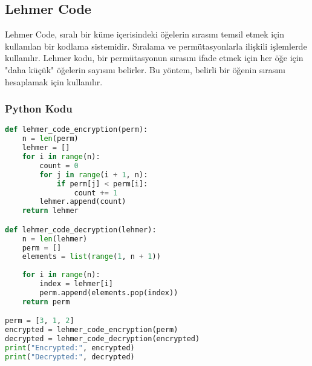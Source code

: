 \subsection{Lehmer Code}

Lehmer Code, sıralı bir küme içerisindeki öğelerin sırasını temsil etmek için kullanılan bir kodlama sistemidir. Sıralama ve permütasyonlarla ilişkili işlemlerde kullanılır. Lehmer kodu, bir permütasyonun sırasını ifade etmek için her öğe için "daha küçük" öğelerin sayısını belirler. Bu yöntem, belirli bir öğenin sırasını hesaplamak için kullanılır.

\subsubsection{Python Kodu}

\begin{lstlisting}[language=Python]
def lehmer_code_encryption(perm):
    n = len(perm)
    lehmer = []
    for i in range(n):
        count = 0
        for j in range(i + 1, n):
            if perm[j] < perm[i]:
                count += 1
        lehmer.append(count)
    return lehmer

def lehmer_code_decryption(lehmer):
    n = len(lehmer)
    perm = []
    elements = list(range(1, n + 1))
    
    for i in range(n):
        index = lehmer[i]
        perm.append(elements.pop(index))
    return perm

perm = [3, 1, 2]
encrypted = lehmer_code_encryption(perm)
decrypted = lehmer_code_decryption(encrypted)
print("Encrypted:", encrypted)
print("Decrypted:", decrypted)
\end{lstlisting}

\newpage